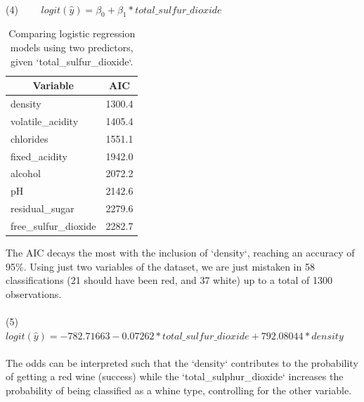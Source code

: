 \documentclass[10pt]{article}
\begin{document}
\paragraph*{}
(4) \ \ \ \ $logit(\hat{y}) = \beta_0 + \beta_1*total\_sulfur\_dioxide$

\begin{table}[H]
	\centering
	\begin{tabular}{|l|l|}
		\hline
		\multicolumn{1}{|c|}{\textbf{Variable}} & \multicolumn{1}{c|}{\textbf{AIC}} \\ \hline
		density                                 & 1300.4                            \\ \hline
		volatile\_acidity                       & 1405.4                            \\ \hline
		chlorides                               & 1551.1                            \\ \hline
		fixed\_acidity                          & 1942.0                            \\ \hline
		alcohol                                 & 2072.2                            \\ \hline
		pH                                      & 2142.6                            \\ \hline
		residual\_sugar                         & 2279.6                            \\ \hline
		free\_sulfur\_dioxide                   & 2282.7                            \\ \hline
	\end{tabular}
	\caption{Comparing logistic regression models using two predictors, given `total\_sulfur\_dioxide`.}
	\label{table:two-predictors}
\end{table}


The AIC decays the most with the inclusion of `density`, reaching an accuracy of 95\%. Using just two variables of the dataset, we are just mistaken in 58 classifications (21 should have been red, and 37 white) up to a total of 1300 observations.

\paragraph*{}
(5) \ \ \ $logit(\hat{y}) = -782.71663  -0.07262*total\_sulfur\_dioxide +792.08044  *density$

\paragraph*{}
The odds can be interpreted such that the `density` contributes to the probability of getting a red wine (success) while the `total\_sulphur\_dioxide` increases the probability of being classified as a whine type, controlling for the other variable.
\end{document}

